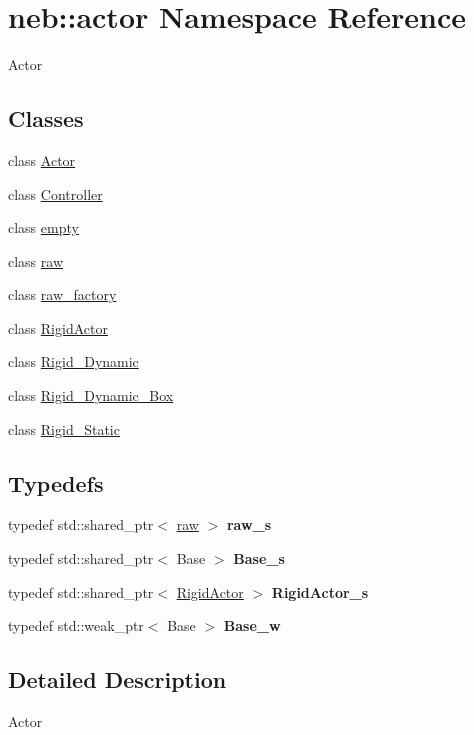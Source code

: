 \hypertarget{namespaceneb_1_1actor}{
\section{neb::actor Namespace Reference}
\label{namespaceneb_1_1actor}
}


Actor  
\subsection*{Classes}
\begin{DoxyCompactItemize}
\item 
class \hyperlink{classneb_1_1actor_1_1Actor}{Actor}
\item 
class \hyperlink{classneb_1_1actor_1_1Controller}{Controller}
\item 
class \hyperlink{classneb_1_1actor_1_1empty}{empty}
\item 
class \hyperlink{classneb_1_1actor_1_1raw}{raw}
\item 
class \hyperlink{classneb_1_1actor_1_1raw__factory}{raw\_\-factory}
\item 
class \hyperlink{classneb_1_1actor_1_1RigidActor}{RigidActor}
\item 
class \hyperlink{classneb_1_1actor_1_1Rigid__Dynamic}{Rigid\_\-Dynamic}
\item 
class \hyperlink{classneb_1_1actor_1_1Rigid__Dynamic__Box}{Rigid\_\-Dynamic\_\-Box}
\item 
class \hyperlink{classneb_1_1actor_1_1Rigid__Static}{Rigid\_\-Static}
\end{DoxyCompactItemize}
\subsection*{Typedefs}
\begin{DoxyCompactItemize}
\item 
\hypertarget{namespaceneb_1_1actor_a73960d25dc0268960c2d905390726928}{
typedef std::shared\_\-ptr$<$ \hyperlink{classneb_1_1actor_1_1raw}{raw} $>$ {\bfseries raw\_\-s}}
\label{namespaceneb_1_1actor_a73960d25dc0268960c2d905390726928}

\item 
\hypertarget{namespaceneb_1_1actor_ae1e00e55b7bb3faecd0000a4931ddbf1}{
typedef std::shared\_\-ptr$<$ Base $>$ {\bfseries Base\_\-s}}
\label{namespaceneb_1_1actor_ae1e00e55b7bb3faecd0000a4931ddbf1}

\item 
\hypertarget{namespaceneb_1_1actor_a2610dbc7c9aab00554aa1405214d6411}{
typedef std::shared\_\-ptr$<$ \hyperlink{classneb_1_1actor_1_1RigidActor}{RigidActor} $>$ {\bfseries RigidActor\_\-s}}
\label{namespaceneb_1_1actor_a2610dbc7c9aab00554aa1405214d6411}

\item 
\hypertarget{namespaceneb_1_1actor_a101d242bd4894835aa9f2a0738c38b56}{
typedef std::weak\_\-ptr$<$ Base $>$ {\bfseries Base\_\-w}}
\label{namespaceneb_1_1actor_a101d242bd4894835aa9f2a0738c38b56}

\end{DoxyCompactItemize}


\subsection{Detailed Description}
Actor 